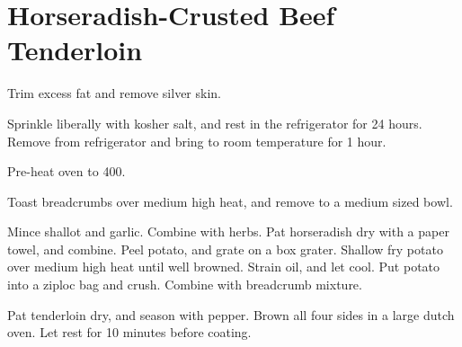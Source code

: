\section{Horseradish-Crusted Beef Tenderloin}
\begin{recipe}



Trim excess fat and remove silver skin. 

Sprinkle liberally with kosher salt, and rest in the refrigerator for 24 hours. Remove from refrigerator
and bring to room temperature for 1 hour. 

Pre-heat oven to 400\degree{}.


Toast breadcrumbs over medium high heat, and remove to a medium sized bowl.


Mince shallot and garlic. Combine with herbs. Pat horseradish dry with a paper towel, and combine. Peel 
potato, and grate on a box grater. Shallow fry potato over medium high heat until well browned. Strain oil, 
and let cool. Put potato into a ziploc bag and crush. Combine with breadcrumb mixture. 

Pat tenderloin dry, and season with pepper. Brown all four sides in a large dutch oven.
Let rest for 10 minutes before coating. 



\end{recipe}
